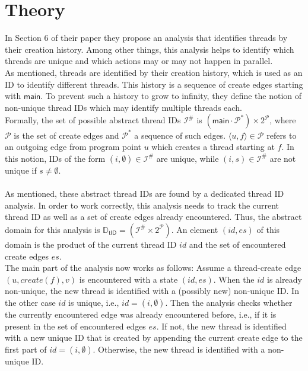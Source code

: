   \section{Theory}\label{sec:threadTheory}
  In Section 6 of their paper \parencite{schwarz2023clustered} they propose an analysis that identifies threads by their creation history. Among other things, this analysis helps to identify which threads are unique and which actions may or may not happen in parallel.\\
  As mentioned, threads are identified by their creation history, which is used as an ID to identify different threads. This history is a sequence of create edges starting with $\textsf{main}$. To prevent such a history to grow to infinity, they define the notion of non-unique thread IDs which may identify multiple threads each.\\
  Formally, the set of possible abstract thread IDs $\mathcal{I}^{\#}$ is $(\textsf{main}\cdot\mathcal{P}^*) \times 2^{\mathcal{P}}$, where $\mathcal{P}$ is the set of create edges and $\mathcal{P}^*$ a sequence of such edges. $\langle u, f \rangle \in \mathcal{P}$ refers to an outgoing edge from program point $u$ which creates a thread starting at $f$.
  In this notion, IDs of the form $(i, \emptyset) \in \mathcal{I}^{\#}$ are unique, while $(i, s) \in \mathcal{I}^{\#}$ are not unique if $s \neq \emptyset$.\\
  \\
  As mentioned, these abstract thread IDs are found by a dedicated thread ID analysis. In order to work correctly, this analysis needs to track the current thread ID as well as a set of create edges already encountered. Thus, the abstract domain for this analysis is $\mathbb{D}_\textsf{tID} = (\mathcal{I}^{\#} \times 2^{\mathcal{P}})$. An element $(id, es)$ of this domain is the product of the current thread ID $id$ and the set of encountered create edges $es$.\\
  The main part of the analysis now works as follows: Assume a thread-create edge $(u, create(f), v)$ is encountered with a state $(id, es)$. When the $id$ is already non-unique, the new thread is identified with a (possibly new) non-unique ID. In the other case $id$ is unique, i.e., $id = (i, \emptyset)$. Then the analysis checks whether the currently encountered edge was already encountered before, i.e., if it is present in the set of encountered edges $es$. If not, the new thread is identified with a new unique ID that is created by appending the current create edge to the first part of $id = (i, \emptyset)$. Otherwise, the new thread is identified with a non-unique ID.\\
